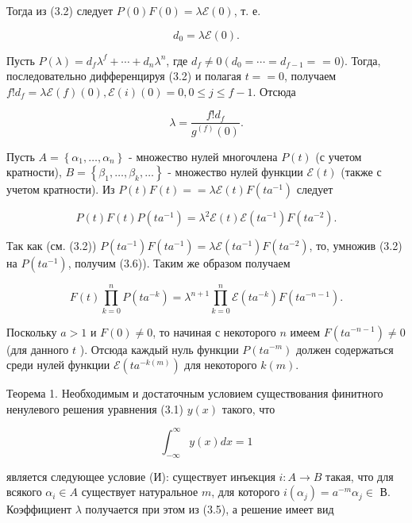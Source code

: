 \documentclass[10pt]{article}
\begin{document}
Тогда из (3.2) следует $P(0) F(0)=\lambda \mathscr{E}(0)$, т. е.


\begin{equation*}
d_{0}=\lambda \mathscr{E}(0) . \tag{3.4}
\end{equation*}


Пусть $P(\lambda)=d_{f} \lambda^{f}+\cdots+d_{n} \lambda^{n}$, где $d_{f} \neq 0\left(d_{0}=\cdots=d_{f-1}=\right.$ = 0). Тогда, последовательно дифференцируя (3.2) и полагая $t= =0$, получаем $f!d_{f}=\lambda \mathscr{E}(f)(0), \mathscr{E}(i)(0)=0,0 \leqslant j \leqslant f-1$. Отсюда


\begin{equation*}
\lambda=\frac{f!d_{f}}{g^{(f)}(0)} . \tag{3.5}
\end{equation*}


Пусть $A=\left\{\alpha_{1}, \ldots, \alpha_{n}\right\}$ - множество нулей многочлена $P(t)$ (с учетом кратности), $B=\left\{\beta_{1}, \ldots, \beta_{k}, \ldots\right\}$ - множество нулей функции $\mathscr{E}(t)$ (также с учетом кратности). Из $P(t) F(t)= =\lambda \mathscr{E}(t) F\left(t a^{-1}\right)$ следует


\begin{equation*}
P(t) F(t) P\left(t a^{-1}\right)=\lambda^{2} \mathscr{E}(t) \mathscr{E}\left(t a^{-1}\right) F\left(t a^{-2}\right) . \tag{3.6}
\end{equation*}


Так как (см. (3.2)) $P\left(t a^{-1}\right) F\left(t a^{-1}\right)=\lambda \mathscr{E}\left(t a^{-1}\right) F\left(t a^{-2}\right)$, то, умножив (3.2) на $P\left(t a^{-1}\right)$, получим (3.6)). Таким же образом получаем


\begin{equation*}
F(t) \prod_{k=0}^{n} P\left(t a^{-k}\right)=\lambda^{n+1} \prod_{k=0}^{n} \mathscr{E}\left(t a^{-k}\right) F\left(t a^{-n-1}\right) . \tag{3.7}
\end{equation*}


Поскольку $a>1$ и $F(0) \neq 0$, то начиная с некоторого $n$ имеем $F\left(t a^{-n-1}\right) \neq 0$ (для данного $t$ ). Отсюда каждый нуль функции $P\left(t a^{-m}\right)$ должен содержаться среди нулей функции $\mathscr{E}\left(t a^{-k(m)}\right)$ для некоторого $k(m)$.

Теорема 1. Необходимым и достаточным условием существования финитного ненулевого решения уравнения (3.1) $y(x)$ такого, что

$$
\int_{-\infty}^{\infty} y(x) d x=1
$$

является следующее условие (И): существует инъекция $i: A \rightarrow B$ такая, что для всякого $\alpha_{i} \in A$ существует натуральное $m$, для которого $i\left(\alpha_{j}\right)=a^{-m} \alpha_{j} \in$ В. Коэффициент $\lambda$ получается при этом из (3.5), а решение имеет вид
\end{document}
